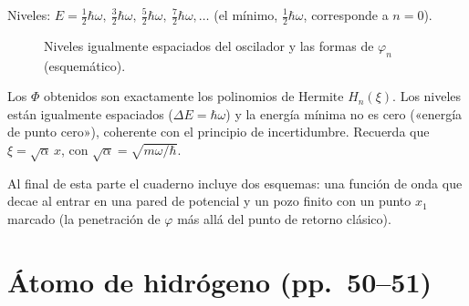 \documentclass[11pt,a4paper]{article}
\newcommand{\pags}[1]{{\normalfont\small\color{gris}(pp.~#1)}}
\begin{document}
Niveles: $E=\tfrac12\hbar\omega,\ \tfrac32\hbar\omega,\ \tfrac52\hbar\omega,\ \tfrac72\hbar\omega,\ldots$ (el mínimo, $\tfrac12\hbar\omega$,
corresponde a $n=0$).

\begin{figure}[H]
\centering
{}
\caption{Niveles igualmente espaciados del oscilador y las formas de $\varphi_n$ (esquemático).}
\end{figure}

\begin{obs}
Los $\Phi$ obtenidos son exactamente los polinomios de Hermite $H_n(\xi)$. Los niveles están igualmente espaciados
($\Delta E=\hbar\omega$) y la energía mínima no es cero («energía de punto cero»), coherente con el principio de
incertidumbre. Recuerda que $\xi=\sqrt\alpha\,x$, con $\sqrt\alpha=\sqrt{m\omega/\hbar}$.
\end{obs}

Al final de esta parte el cuaderno incluye dos esquemas: una función de onda que decae al entrar en una pared de
potencial y un pozo finito con un punto $x_1$ marcado (la penetración de $\varphi$ más allá del punto de retorno clásico).

\section{Átomo de hidrógeno \pags{50--51}}
\end{document}
